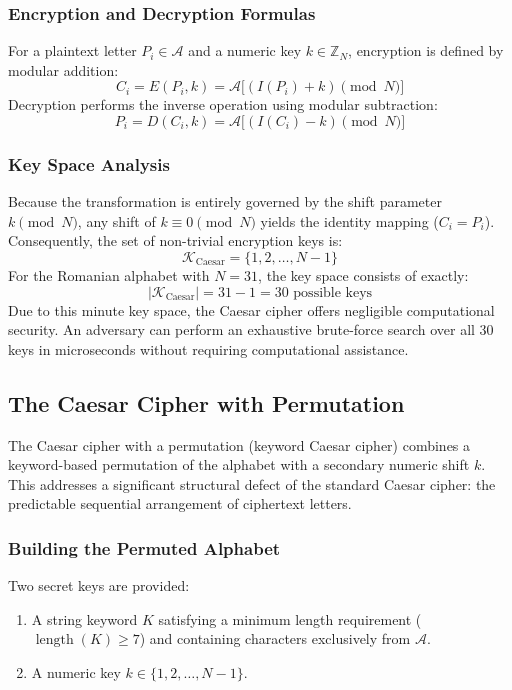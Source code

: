 \documentclass{labreport}
\begin{document}
\subsubsection{Encryption and Decryption Formulas}
For a plaintext letter $P_i \in \mathcal{A}$ and a numeric key $k \in \mathbb{Z}_N$, encryption is defined by modular addition:
\begin{equation}
C_i = E(P_i, k) = \mathcal{A}\big[(I(P_i) + k) \pmod N\big]
\end{equation}
Decryption performs the inverse operation using modular subtraction:
\begin{equation}
P_i = D(C_i, k) = \mathcal{A}\big[(I(C_i) - k) \pmod N\big]
\end{equation}

\subsubsection{Key Space Analysis}
Because the transformation is entirely governed by the shift parameter $k \pmod N$, any shift of $k \equiv 0 \pmod N$ yields the identity mapping ($C_i = P_i$). Consequently, the set of non-trivial encryption keys is:
\begin{equation}
\mathcal{K}_{\text{Caesar}} = \{1, 2, \dots, N - 1\}
\end{equation}
For the Romanian alphabet with $N = 31$, the key space consists of exactly:
\begin{equation}
|\mathcal{K}_{\text{Caesar}}| = 31 - 1 = 30 \text{ possible keys}
\end{equation}
Due to this minute key space, the Caesar cipher offers negligible computational security. An adversary can perform an exhaustive brute-force search over all 30 keys in microseconds without requiring computational assistance.

\subsection{The Caesar Cipher with Permutation}
The Caesar cipher with a permutation (keyword Caesar cipher) combines a keyword-based permutation of the alphabet with a secondary numeric shift $k$. This addresses a significant structural defect of the standard Caesar cipher: the predictable sequential arrangement of ciphertext letters.

\subsubsection{Building the Permuted Alphabet}
Two secret keys are provided:
\begin{enumerate}
    \item A string keyword $K$ satisfying a minimum length requirement ($\operatorname{length}(K) \ge 7$) and containing characters exclusively from $\mathcal{A}$.
    \item A numeric key $k \in \{1, 2, \dots, N - 1\}$.
\end{enumerate}
\end{document}

